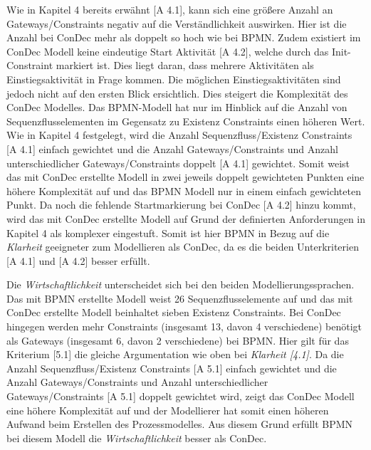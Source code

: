 Wie in Kapitel 4 bereits erwähnt [A 4.1], kann sich eine größere Anzahl an Gateways/Constraints negativ auf die Verständlichkeit auswirken. Hier ist die Anzahl bei ConDec mehr als doppelt so hoch wie bei BPMN. Zudem existiert im ConDec Modell keine eindeutige Start Aktivität [A 4.2], welche durch das Init-Constraint markiert ist. Dies liegt daran, dass mehrere Aktivitäten als Einstiegsaktivität in Frage kommen. Die möglichen Einstiegsaktivitäten sind jedoch nicht auf den ersten Blick ersichtlich. Dies steigert die Komplexität des ConDec Modelles. \newline
Das BPMN-Modell hat nur im Hinblick auf die Anzahl von Sequenzflusselementen im Gegensatz zu Existenz Constraints einen höheren Wert. Wie in Kapitel 4 festgelegt, wird die Anzahl Sequenzfluss/Existenz Constraints [A 4.1] einfach gewichtet und die Anzahl Gateways/Constraints und Anzahl unterschiedlicher Gateways/Constraints doppelt [A 4.1] gewichtet. Somit weist das mit ConDec erstellte Modell in zwei jeweils doppelt gewichteten Punkten eine höhere Komplexität auf und das BPMN Modell nur in einem einfach gewichteten Punkt. Da noch die fehlende Startmarkierung bei ConDec [A 4.2] hinzu kommt, wird das mit ConDec erstellte Modell auf Grund der definierten Anforderungen in Kapitel 4 als komplexer eingestuft.
\newline
Somit ist hier BPMN in Bezug auf die \textit{Klarheit} geeigneter zum Modellieren als ConDec, da es die beiden Unterkriterien [A 4.1] und [A 4.2] besser erfüllt.\newline

Die \textit{Wirtschaftlichkeit} unterscheidet sich bei den beiden Modellierungssprachen. Das mit BPMN erstellte Modell weist 26 Sequenzflusselemente auf und das mit ConDec erstellte Modell beinhaltet sieben Existenz Constraints. Bei ConDec hingegen werden mehr Constraints (insgesamt 13, davon 4 verschiedene) benötigt als Gateways (insgesamt 6, davon 2 verschiedene) bei BPMN. Hier gilt für das Kriterium [5.1] die gleiche Argumentation wie oben bei \textit{Klarheit [4.1]}. Da die Anzahl Sequenzfluss/Existenz Constraints [A 5.1] einfach gewichtet und die Anzahl Gateways/Constraints und Anzahl unterschiedlicher Gateways/Constraints [A 5.1] doppelt gewichtet wird, zeigt das ConDec Modell eine höhere Komplexität auf und der Modellierer hat somit einen höheren Aufwand beim Erstellen des Prozessmodelles.\newline
Aus diesem Grund erfüllt BPMN bei diesem Modell die \textit{Wirtschaftlichkeit} besser als ConDec.\newline

